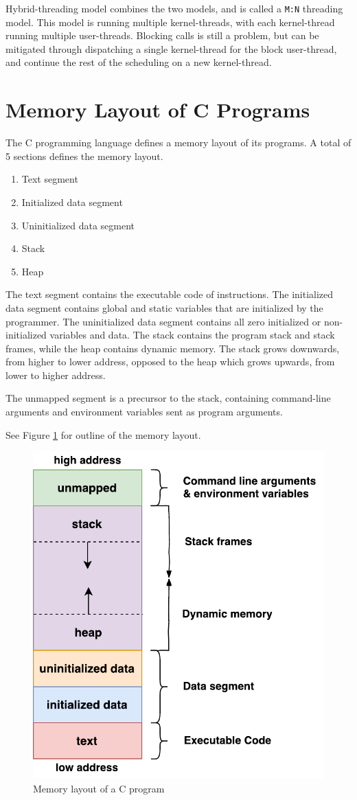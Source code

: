Hybrid-threading model combines the two models, and is called a \texttt{M:N} threading model. This model is running multiple kernel\hyp{}threads, with each kernel-thread running multiple user\hyp{}threads. Blocking calls is still a problem, but can be mitigated through dispatching a single kernel\hyp{}thread for the block user\hyp{}thread, and continue the rest of the scheduling on a new kernel\hyp{}thread. 


\section{Memory Layout of C Programs}
\label{sec:memory_layout_c}

\FloatBarrier

The C programming language defines a memory layout of its programs. A total of 5 sections defines the memory layout.

\begin{enumerate}[topsep=0em,itemsep=-1em,partopsep=0.5em,parsep=1em]
    \item Text segment
    \item Initialized data segment
    \item Uninitialized data segment
    \item Stack
    \item Heap
\end{enumerate}

The text segment contains the executable code of instructions. The initialized data segment contains global and static variables that are initialized by the programmer. The uninitialized data segment contains all zero initialized or non\hyp{}initialized variables and data. The stack contains the program stack and stack frames, while the heap contains dynamic memory. The stack grows downwards, from higher to lower address, opposed to the heap which grows upwards, from lower to higher address. 

The unmapped segment is a precursor to the stack, containing command-line arguments and environment variables sent as program arguments. 

See Figure \ref{fig:c_memory_layout} for outline of the memory layout.

\begin{figure}[h!]
    \centering
    \includegraphics[width=0.5\linewidth]{fig/c_memory_layout}
    \caption{Memory layout of a C program}
    \label{fig:c_memory_layout}
\end{figure}

